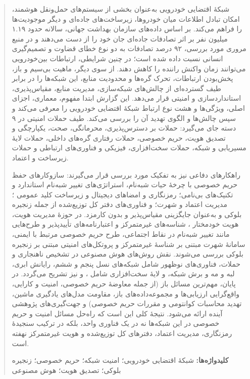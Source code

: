 \documentclass[12pt,a4paper]{article}
\begin{document}
\begin{abstract}
شبکهٔ اقتضایی خودرویی  به‌عنوان بخشی از سیستم‌های حمل‌ونقل هوشمند، امکان تبادل اطلاعات میان خودروها، زیرساخت‌های جاده‌ای و دیگر موجودیت‌ها را فراهم می‌کند. بر اساس داده‌های سازمان بهداشت جهانی، سالانه حدود ۱.۱۹ میلیون نفر بر اثر تصادفات جاده‌ای جان خود را از دست می‌دهند و در منبع مروری مورد بررسی، ۹۲ درصد تصادفات به دو نوع خطای قضاوت و تصمیم‌گیری انسانی نسبت داده شده است؛ در چنین شرایطی، ارتباطات بین‌خودرویی می‌توانند زمان واکنش راننده را کاهش دهند. از سوی دیگر، ماهیت بی‌سیم و باز، پخش‌بودن ارتباطات، تحرک گره‌ها و محدودیت منابع، این شبکه‌ها را در برابر طیف گسترده‌ای از چالش‌های شبکه‌سازی، مدیریت منابع، مقیاس‌پذیری، استانداردسازی و امنیتی قرار می‌دهد. این گزارش ابتدا مفهوم، معماری، اجزای اصلی، ویژگی‌ها و هشت نوع ارتباط شبکهٔ اقتضایی خودرویی را معرفی می‌کند و سپس چالش‌ها و الگوی تهدید آن را بررسی می‌کند. طیف حملات امنیتی در ۹ دسته جای می‌گیرد: حملات بر دسترس‌پذیری، محرمانگی، صحت، یکپارچگی و تصدیق هویت، حریم خصوصی، حملات رفتاری گره‌های داخلی، حملات لایهٔ مسیریابی و شبکه، حملات سخت‌افزاری، فیزیکی و فناوری‌های ارتباطی و حملات زیرساخت و اعتماد.

راهکار‌های دفاعی نیز به تفکیک مورد بررسی قرار می‌گیرند: سازوکار‌های حفظ حریم خصوصی با چرخهٔ حیات شبه‌نام، استراتژی‌های تغییر شبه‌نام استاندارد  و تکنیک‌های بی‌نامی؛ رمزنگاری و امضا‌های دیجیتال و زیرساخت کلید عمومی ؛ مدیریت اعتماد و شهرت؛ و فناوری‌های دفتر کل توزیع‌شده از جمله زنجیره بلوکی و  به‌عنوان جایگزینی مقیاس‌پذیر و بدون کارمزد. در حوزهٔ مدیریت هویت، هویت خودمختار ، شناسه‌های غیرمتمرکز  و اعتبارنامه‌های تأییدپذیر  و طرح‌هایی مانند تغییر شبه‌نام در نقاط اجتماعی، طرح حریم خصوصی مرتبط با ایمنی، سامانهٔ شهرت مبتنی بر شناسهٔ غیرمتمرکز و پروتکل‌های امنیتی مبتنی بر زنجیره بلوکی بررسی می‌شوند. نقش روش‌های هوش مصنوعی در تشخیص ناهنجاری و حملات، فناوری‌های نوظهور شامل شبکه‌های نسل پنجم و ششم، رایانش ابری، لبه و مه و برش شبکه، و لایهٔ سخت‌افزاری شامل ،  و  نیز تشریح می‌گردد. در پایان، مهم‌ترین مسائل باز (از جمله معاوضهٔ حریم خصوصی، امنیت و کارایی، واقع‌گرایی ارزیابی‌ها و مجموعه‌داده‌های باز، مقاومت مدل‌های یادگیری ماشین، تهدید محاسبات کوانتومی و مقررات حریم خصوصی) و جهت‌گیری‌های پژوهشی آینده ارائه می‌شود. نتیجهٔ کلی این است که راه‌حل مسائل امنیت و حریم خصوصی در این شبکه‌ها نه در یک فناوری واحد، بلکه در ترکیب سنجیدهٔ رمزنگاری، مدیریت اعتماد، دفتر‌های کل توزیع‌شده و هویت غیرمتمرکز نهفته است.

\noindent\textbf{کلیدواژه‌ها:} شبکهٔ اقتضایی خودرویی؛ امنیت شبکه؛ حریم خصوصی؛ زنجیره بلوکی؛ تصدیق هویت؛ هوش مصنوعی
\end{abstract}
\end{document}
